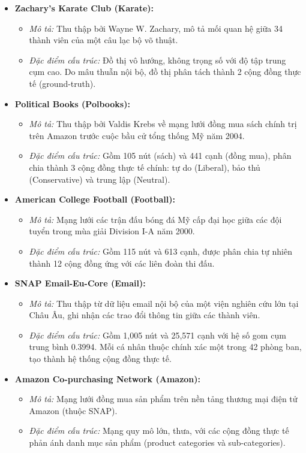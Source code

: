 \documentclass[14pt,a4paper]{extarticle}
\begin{document}
\begin{itemize}
    \item \textbf{Zachary's Karate Club (Karate):}
    \begin{itemize}
        \item \textit{Mô tả:} Thu thập bởi Wayne W. Zachary, mô tả mối quan hệ giữa 34 thành viên của một câu lạc bộ võ thuật.
        \item \textit{Đặc điểm cấu trúc:} Đồ thị vô hướng, không trọng số với độ tập trung cụm cao. Do mâu thuẫn nội bộ, đồ thị phân tách thành 2 cộng đồng thực tế (ground-truth).
    \end{itemize}

    \item \textbf{Political Books (Polbooks):}
    \begin{itemize}
        \item \textit{Mô tả:} Thu thập bởi Valdis Krebs về mạng lưới đồng mua sách chính trị trên Amazon trước cuộc bầu cử tổng thống Mỹ năm 2004.
        \item \textit{Đặc điểm cấu trúc:} Gồm 105 nút (sách) và 441 cạnh (đồng mua), phân chia thành 3 cộng đồng thực tế chính: tự do (Liberal), bảo thủ (Conservative) và trung lập (Neutral).
    \end{itemize}

    \item \textbf{American College Football (Football):}
    \begin{itemize}
        \item \textit{Mô tả:} Mạng lưới các trận đấu bóng đá Mỹ cấp đại học giữa các đội tuyển trong mùa giải Division I-A năm 2000.
        \item \textit{Đặc điểm cấu trúc:} Gồm 115 nút và 613 cạnh, được phân chia tự nhiên thành 12 cộng đồng ứng với các liên đoàn thi đấu.
    \end{itemize}

    \item \textbf{SNAP Email-Eu-Core (Email):}
    \begin{itemize}
        \item \textit{Mô tả:} Thu thập từ dữ liệu email nội bộ của một viện nghiên cứu lớn tại Châu Âu, ghi nhận các trao đổi thông tin giữa các thành viên.
        \item \textit{Đặc điểm cấu trúc:} Gồm 1,005 nút và 25,571 cạnh với hệ số gom cụm trung bình 0.3994. Mỗi cá nhân thuộc chính xác một trong 42 phòng ban, tạo thành hệ thống cộng đồng thực tế.
    \end{itemize}

    \item \textbf{Amazon Co-purchasing Network (Amazon):}
    \begin{itemize}
        \item \textit{Mô tả:} Mạng lưới đồng mua sản phẩm trên nền tảng thương mại điện tử Amazon (thuộc SNAP).
        \item \textit{Đặc điểm cấu trúc:} Mạng quy mô lớn, thưa, với các cộng đồng thực tế phản ánh danh mục sản phẩm (product categories và sub-categories).
    \end{itemize}
\end{itemize}
\end{document}
